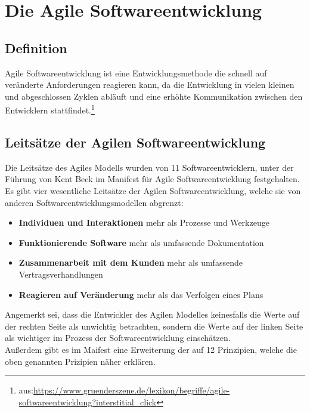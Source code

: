\documentclass[a4paper, 10pt]{scrartcl}
\begin{document}
\newpage
\section{Die Agile Softwareentwicklung}
\subsection{Definition}
\begin{center}
\large{\glqq{} Agile Softwareentwicklung ist eine Entwicklungsmethode die schnell auf veränderte Anforderungen reagieren kann, da die Entwicklung in vielen kleinen und abgeschlossen Zyklen abläuft und eine erhöhte Kommunikation zwischen den Entwicklern stattfindet.\grqq{}}\footnote{aus:\url{https://www.gruenderszene.de/lexikon/begriffe/agile-softwareentwicklung?interstitial_click}} \\
\end{center}

\subsection{Leitsätze der Agilen Softwareentwicklung}
Die Leitsätze des Agiles Modells wurden von 11 Softwareentwicklern, unter der Führung von Kent Beck im \glqq{}Manifest für Agile Softwareentwicklung\grqq{} festgehalten. Es gibt vier wesentliche Leitsätze der Agilen Softwareentwicklung, welche sie von \\anderen Softwareentwicklungsmodellen abgrenzt:
\begin{itemize}
\item \glqq{}\textbf{Individuen und Interaktionen} mehr als Prozesse und Werkzeuge\grqq{} \cite{Beck2013} 
\item \glqq{}\textbf{Funktionierende Software} mehr als umfassende Dokumentation\grqq{} \cite{Beck2013} 
\item \glqq{}\textbf{Zusammenarbeit mit dem Kunden} mehr als umfassende Vertragsverhandlungen\grqq{} \cite{Beck2013} 
\item \glqq{}\textbf{Reagieren auf Veränderung} mehr als das Verfolgen eines Plans\grqq{} \cite{Beck2013} 
\end{itemize}
Angemerkt sei, dass die Entwickler des Agilen Modelles keinesfalls die Werte auf der rechten Seite als unwichtig betrachten, sondern die Werte auf der linken Seite als wichtiger im Prozess der Softwareentwicklung einschätzen.\\
Außerdem gibt es im Maifest eine Erweiterung der auf 12 Prinzipien, welche die oben genannten Prizipien näher erklären.\citep{Beck2013} 
\end{document}
